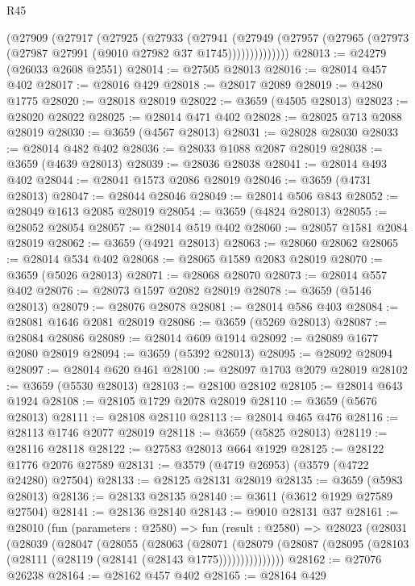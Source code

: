 \begin{lexlean}{R45}
\begin{coremodule}
          (@27909
            (@27917
              (@27925
                (@27933
                  (@27941
                    (@27949
                      (@27957 (@27965 (@27973 (@27987 @27991 (@9010 @27982 @37 @1745))))))))))))))
@28013 := @24279 (@26033 @2608 @2551)
@28014 := @27505 @28013
@28016 := @28014 @457 @402
@28017 := @28016 @429
@28018 := @28017 @2089
@28019 := @4280 @1775
@28020 := @28018 @28019
@28022 := @3659 (@4505 @28013)
@28023 := @28020 @28022
@28025 := @28014 @471 @402
@28028 := @28025 @713 @2088 @28019
@28030 := @3659 (@4567 @28013)
@28031 := @28028 @28030
@28033 := @28014 @482 @402
@28036 := @28033 @1088 @2087 @28019
@28038 := @3659 (@4639 @28013)
@28039 := @28036 @28038
@28041 := @28014 @493 @402
@28044 := @28041 @1573 @2086 @28019
@28046 := @3659 (@4731 @28013)
@28047 := @28044 @28046
@28049 := @28014 @506 @843
@28052 := @28049 @1613 @2085 @28019
@28054 := @3659 (@4824 @28013)
@28055 := @28052 @28054
@28057 := @28014 @519 @402
@28060 := @28057 @1581 @2084 @28019
@28062 := @3659 (@4921 @28013)
@28063 := @28060 @28062
@28065 := @28014 @534 @402
@28068 := @28065 @1589 @2083 @28019
@28070 := @3659 (@5026 @28013)
@28071 := @28068 @28070
@28073 := @28014 @557 @402
@28076 := @28073 @1597 @2082 @28019
@28078 := @3659 (@5146 @28013)
@28079 := @28076 @28078
@28081 := @28014 @586 @403
@28084 := @28081 @1646 @2081 @28019
@28086 := @3659 (@5269 @28013)
@28087 := @28084 @28086
@28089 := @28014 @609 @1914
@28092 := @28089 @1677 @2080 @28019
@28094 := @3659 (@5392 @28013)
@28095 := @28092 @28094
@28097 := @28014 @620 @461
@28100 := @28097 @1703 @2079 @28019
@28102 := @3659 (@5530 @28013)
@28103 := @28100 @28102
@28105 := @28014 @643 @1924
@28108 := @28105 @1729 @2078 @28019
@28110 := @3659 (@5676 @28013)
@28111 := @28108 @28110
@28113 := @28014 @465 @476
@28116 := @28113 @1746 @2077 @28019
@28118 := @3659 (@5825 @28013)
@28119 := @28116 @28118
@28122 := @27583 @28013 @664 @1929
@28125 := @28122 @1776 @2076 @27589
@28131 := @3579 (@4719 @26953) (@3579 (@4722 @24280) @27504)
@28133 := @28125 @28131 @28019
@28135 := @3659 (@5983 @28013)
@28136 := @28133 @28135
@28140 := @3611 (@3612 @1929 @27589 @27504)
@28141 := @28136 @28140
@28143 := @9010 @28131 @37
@28161 := @28010
    (fun (parameters : @2580) =>
    fun (result : @2580) =>
    @28023
      (@28031
        (@28039
          (@28047
            (@28055
              (@28063
                (@28071
                  (@28079
                    (@28087 (@28095 (@28103 (@28111 (@28119 (@28141 (@28143 @1775)))))))))))))))
@28162 := @27076 @26238
@28164 := @28162 @457 @402
@28165 := @28164 @429

\end{coremodule}
\end{lexlean}
